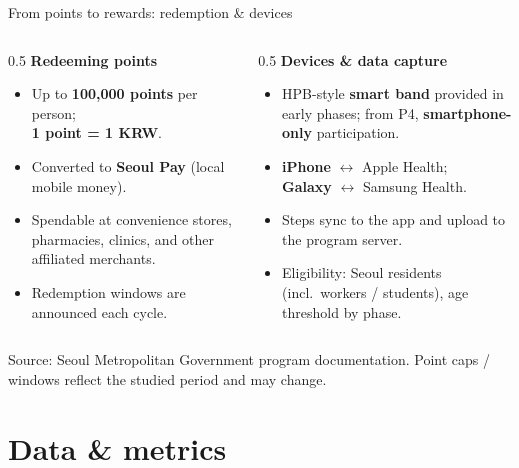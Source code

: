 \documentclass[10pt,aspectratio=169]{beamer}
\newcommand{\src}[1]{{\color{graytx}\scriptsize Source: #1}}
\newcommand{\hi}[1]{{\color{teal}\bfseries #1}}
\begin{document}
\begin{frame}{From points to rewards: redemption \& devices}
  \begin{columns}[T]
    \begin{column}{0.5\textwidth}
      \textbf{\color{ink}Redeeming points}
      \begin{itemize}
        \item Up to \hi{100{,}000 points} per person; \\ \textbf{1 point = 1 KRW}.
        \item Converted to \textbf{Seoul Pay} (local mobile money).
        \item Spendable at convenience stores, pharmacies, clinics, and other affiliated merchants.
        \item Redemption windows are announced each cycle.
      \end{itemize}
    \end{column}
    \begin{column}{0.5\textwidth}
      \textbf{\color{ink}Devices \& data capture}
      \begin{itemize}
        \item HPB-style \textbf{smart band} provided in early phases; from P4, \textbf{smartphone-only} participation.
        \item \textbf{iPhone} $\leftrightarrow$ Apple Health; \\ \textbf{Galaxy} $\leftrightarrow$ Samsung Health.
        \item Steps sync to the app and upload to the program server.
        \item Eligibility: Seoul residents (incl.\ workers / students), age threshold by phase.
      \end{itemize}
    \end{column}
  \end{columns}
  \vfill
  \src{Seoul Metropolitan Government program documentation. Point caps / windows reflect the studied period and may change.}
\end{frame}

\section{Data \& metrics}
\end{document}
